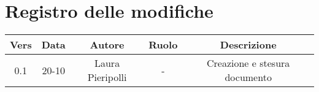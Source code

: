 \section{Registro delle modifiche}

\begin{table}[htbp]
	\begin{tabular}{|c|c|c|c|c|}
		\hline
		\rowcolor[gray]{0.9}
		Vers & Data & Autore & Ruolo & Descrizione \\
		\hline
		0.1 & 20-10 & Laura Pieripolli & - & Creazione e stesura documento \\
		\hline
	\end{tabular}
\end{table}